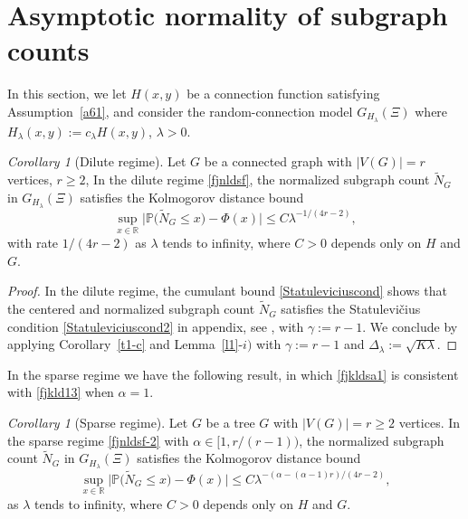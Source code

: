 \documentclass[bj,authoryear,noshowframe]{imsart}
\theoremstyle{plain}
\theoremstyle{remark}
\def\P{\mathbb{P}}
\def\real{{\mathord{\mathbb R}}}
\newtheorem{corollary}[prop]{Corollary}
\begin{document}
 \section{Asymptotic normality of subgraph counts}
 \label{s6-1}
 \vspace{-0.1cm}
 \noindent
  In this section, we let $H(x,y)$ be a connection function  
   satisfying Assumption~\ref{a61},
   and consider the
   random-connection model $G_{H_\lambda} (\Xi)$
   where $H_\lambda(x,y):= c_\lambda H(x,y)$,
   $\lambda >0$.
 \begin{corollary}[Dilute regime]
   \label{c01}
   Let $G$ be a connected graph with $|V(G)|=r$ vertices, $r\geq 2$,
   In the dilute regime \eqref{fjnldsf},
   the normalized subgraph count $\widetilde{N}_G$ in 
   $G_{H_\lambda} (\Xi)$ satisfies
   the Kolmogorov distance bound %
 \begin{equation}
   \label{fjkld13}
   \sup_{x\in \real}
 \big| \P \big( \widetilde{N}_G \leq x \big) - \Phi(x) \big| \leq
 C \lambda^{ - 1/(4r - 2)},
 \end{equation}
  with rate $1/(4r -2)$ as $\lambda$ tends to infinity, where $C>0$ depends only on $H$ and $G$.
 \end{corollary}
 \begin{proof}
    In the dilute regime, the cumulant bound 
  \eqref{Statuleviciuscond} 
  shows that
  the centered and normalized subgraph count
  $\widetilde{N}_G$ 
  satisfies the {Statulevi\v{c}ius condition}
  \eqref{Statuleviciuscond2} in appendix, see \cite{rudzkis,doering},
  with $\gamma := r-1$. 
  We conclude by applying Corollary~\ref{t1-c}
  and Lemma~\ref{l1}-$i)$ with $\gamma :=r-1$
  and $\Delta_\lambda:=\sqrt{K \lambda}$. 
 \end{proof}
 In the sparse regime we have the following result, 
  in which \eqref{fjkldsa1} is consistent with
  \eqref{fjkld13} when $\alpha = 1$.
 \begin{corollary}[Sparse regime]
   \label{c01-2}
   Let $G$ be a tree $G$ with $|V(G)| = r \geq 2$ vertices. 
   In the sparse regime \eqref{fjnldsf-2}
   with $\alpha \in [1, r/(r-1) )$,
   the normalized subgraph count $\widetilde{N}_G$ in 
   $G_{H_\lambda} (\Xi)$ satisfies
   the Kolmogorov distance bound %
 \begin{equation}
 \label{fjkldsa1} 
 \sup_{x\in \real}
 \big| \P \big( \widetilde{N}_G \leq x \big) - \Phi(x) \big| \leq
 C \lambda^{ - (
  \alpha   -(\alpha - 1)r 
     ) / ( 4r - 2) }, 
 \end{equation} 
  as $\lambda$ tends to infinity, where $C>0$ depends only on $H$ and $G$.
 \end{corollary}
\end{document}
